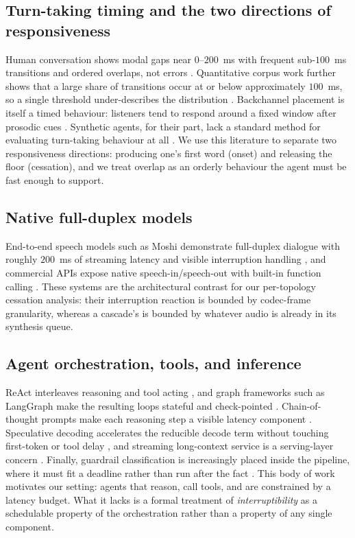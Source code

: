 \subsection{Turn-taking timing and the two directions of responsiveness}
Human conversation shows modal gaps near $0$--$200$~ms with frequent sub-$100$~ms transitions
and ordered overlaps, not errors \citep{levinson2015timing,stivers2009universals,schegloff2000overlap}.
Quantitative corpus work further shows that a large share of transitions occur at or below
approximately $100$~ms, so a single threshold under-describes the distribution
\citep{heldner2010gaps}.
Backchannel placement is itself a timed behaviour: listeners tend to respond around a fixed
window after prosodic cues \citep{ward2000backchannel}.
Synthetic agents, for their part, lack a standard method for evaluating turn-taking behaviour
at all \citep{skantze2021turn}.
We use this literature to separate two responsiveness directions: producing one's first word
(onset) and releasing the floor (cessation), and we treat overlap as an orderly behaviour the
agent must be fast enough to support.

\subsection{Native full-duplex models}
End-to-end speech models such as Moshi demonstrate full-duplex dialogue with roughly $200$~ms of
streaming latency and visible interruption handling \citep{defossez2024moshi}, and commercial
APIs expose native speech-in/speech-out with built-in function calling
\citep{openai2024realtimeapi,google2024geminivoice}.
These systems are the architectural contrast for our per-topology cessation analysis: their
interruption reaction is bounded by codec-frame granularity, whereas a cascade's is bounded by
whatever audio is already in its synthesis queue.

\subsection{Agent orchestration, tools, and inference}
ReAct interleaves reasoning and tool acting \citep{yao2023react}, and graph frameworks such as
LangGraph make the resulting loops stateful and check-pointed \citep{langgraph2024}.
Chain-of-thought prompts make each reasoning step a visible latency component
\citep{wei2023chainofthought}.
Speculative decoding accelerates the reducible decode term without touching first-token or tool
delay \citep{leviathan2023fast}, and streaming long-context service is a serving-layer
concern \citep{xiao2023streamingllm}.
Finally, guardrail classification is increasingly placed inside the pipeline, where it must fit
a deadline rather than run after the fact \citep{dong2024building}.
This body of work motivates our setting: agents that reason, call tools, and are constrained by
a latency budget.
What it lacks is a formal treatment of \emph{interruptibility} as a schedulable property of
the orchestration rather than a property of any single component.

